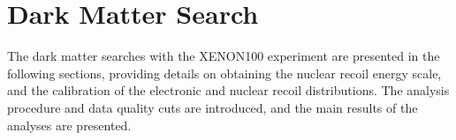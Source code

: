 \chapter{Dark Matter Search}
\label{chDarkMatterSearch}

The dark matter searches with the XENON100 experiment are presented in the following sections, providing details on obtaining the nuclear recoil energy scale, and the calibration of the electronic and nuclear recoil distributions. The analysis procedure and data quality cuts are introduced, and the main results of the analyses are presented.

